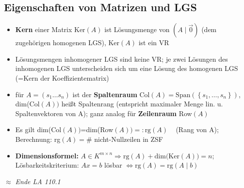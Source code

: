 \documentclass[10pt,a4paper]{article}
\begin{document}
\subsection{Eigenschaften von Matrizen und LGS}
\begin{itemize}


\item \textbf{Kern} einer Matrix Ker$(A)$ ist Lösungsmenge von $(A\mid \overrightarrow{0})$ (dem zugehörigen homogenen LGS), Ker$(A)$ ist ein VR
\item Lösungsmengen inhomogener LGS sind keine VR; je zwei Lösungen des inhomogenen LGS unterscheiden sich um eine Lösung des homogenen LGS (=Kern der Koeffizientematrix)
\item für $A=(s_{1}\dotsc s_{n})$ ist der \textbf{Spaltenraum} Col$(A)=\text{Span}(\left\lbrace s_{1},\dotsc, s_{n}\right\rbrace)$, dim(Col$(A))$ heißt Spaltenrang (entspricht maximaler Menge lin. u. Spaltenvektoren von A); ganz analog für \textbf{Zeilenraum} Row$(A)$
\item Es gilt dim(Col$(A))$=dim(Row$(A))=:\text{rg}(A)\;\;\;$ (Rang von A); Berechnung: rg$(A)= \#$ nicht-Nullzeilen in ZSF
\item \textbf{Dimensionsformel: }$A\in K^{m \times n}\Rightarrow\text{rg}(A)+\text{dim(Ker}(A))=n$;  Lösbarkeitskriterium: $Ax=b$ lösbar $\Leftrightarrow \text{rg}(A)=\text{rg}(A \mid b)$
\end{itemize}
\textit{$\approx$ Ende LA 110.1}
\end{document}
